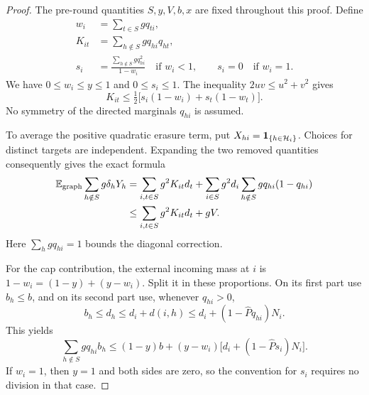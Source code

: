 \begin{proof}
The pre-round quantities $S,y,V,b,x$ are fixed throughout this proof.
Define
\begin{equation}\label{eq:rnd-graph-statistics}
 \begin{aligned}
 w_i&=\sum_{t\in S}gq_{ti},\\
 K_{it}&=\sum_{h\notin S}gq_{hi}q_{ht},\\
 s_i&=\frac{\sum_{h\notin S}gq_{hi}^2}{1-w_i}
       \quad\text{if }w_i<1,
       \qquad s_i=0\quad\text{if }w_i=1.
 \end{aligned}
\end{equation}
We have $0\le w_i\le y\le1$ and $0\le s_i\le1$.
The inequality $2uv\le u^2+v^2$ gives
\begin{equation}\label{eq:rnd-kernel-bound}
 K_{it}\le\tfrac12\bigl[s_i(1-w_i)+s_t(1-w_t)\bigr].
\end{equation}
No symmetry of the directed marginals $q_{hi}$ is assumed.

To average the positive quadratic erasure term, put
$X_{hi}=\mathbf 1_{\{h\in\mathcal H_i\}}$.  Choices for distinct targets
are independent.  Expanding the two removed quantities consequently
gives the exact formula
\begin{align}
 \mathbb E_{\mathrm{graph}}\sum_{h\notin S}g\delta_hY_h
 &=\sum_{i,t\in S}g^2K_{it}d_t
   +\sum_{i\in S}g^2d_i\sum_{h\notin S}gq_{hi}(1-q_{hi})\notag\\
 &\le\sum_{i,t\in S}g^2K_{it}d_t+gV.
 \label{eq:rnd-diagonal-correction}
\end{align}
Here $\sum_hgq_{hi}=1$ bounds the diagonal correction.

For the cap contribution, the external incoming mass at $i$ is
$1-w_i=(1-y)+(y-w_i)$.  Split it in these proportions.  On its first
part use $b_h\le b$, and on its second part use, whenever $q_{hi}>0$,
\[
 b_h\le d_h\le d_i+d(i,h)
       \le d_i+(1-\widehat Pq_{hi})N_i.
\]
This yields
\begin{equation}\label{eq:rnd-backup-average}
 \sum_{h\notin S}gq_{hi}b_h
 \le(1-y)b+(y-w_i)\bigl[d_i+(1-\widehat Ps_i)N_i\bigr].
\end{equation}
If $w_i=1$, then $y=1$ and both sides are zero, so the convention
for $s_i$ requires no division in that case.


\end{proof}
